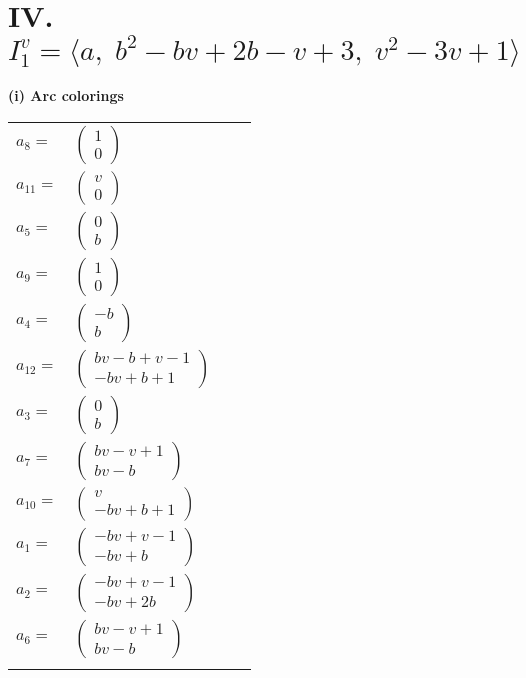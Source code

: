 \documentclass[1p]{elsarticle_modified}
\theoremstyle{definition}
\begin{document}
\centering \section*{IV. $I^v_{1}= \langle a,\;b^2- b v+2 b- v+3,\;v^2-3 v+1 \rangle$}
\flushleft \textbf{(i) Arc colorings}\\
\begin{tabular}{m{7pt} m{180pt} m{7pt} m{180pt} }
\flushright $a_{8}=$&$\begin{pmatrix}1\\0\end{pmatrix}$ \\
\flushright $a_{11}=$&$\begin{pmatrix}v\\0\end{pmatrix}$ \\
\flushright $a_{5}=$&$\begin{pmatrix}0\\b\end{pmatrix}$ \\
\flushright $a_{9}=$&$\begin{pmatrix}1\\0\end{pmatrix}$ \\
\flushright $a_{4}=$&$\begin{pmatrix}- b\\b\end{pmatrix}$ \\
\flushright $a_{12}=$&$\begin{pmatrix}b v- b+v-1\\- b v+b+1\end{pmatrix}$ \\
\flushright $a_{3}=$&$\begin{pmatrix}0\\b\end{pmatrix}$ \\
\flushright $a_{7}=$&$\begin{pmatrix}b v- v+1\\b v- b\end{pmatrix}$ \\
\flushright $a_{10}=$&$\begin{pmatrix}v\\- b v+b+1\end{pmatrix}$ \\
\flushright $a_{1}=$&$\begin{pmatrix}- b v+v-1\\- b v+b\end{pmatrix}$ \\
\flushright $a_{2}=$&$\begin{pmatrix}- b v+v-1\\- b v+2 b\end{pmatrix}$ \\
\flushright $a_{6}=$&$\begin{pmatrix}b v- v+1\\b v- b\end{pmatrix}$\\&\end{tabular}
\end{document}
